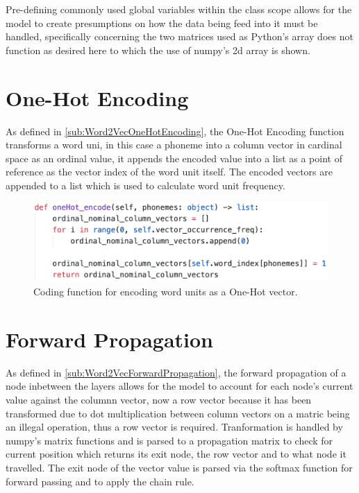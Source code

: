 Pre-defining commonly used global variables within the class scope allows for the model to create presumptions on how the data being feed into it must be handled, specifically concerning the two matrices used as Python's array does not function as desired here to which the use of numpy's 2d array is shown.

\section{One-Hot Encoding}

As defined in \autoref{sub:Word2VecOneHotEncoding}, the One-Hot Encoding function transforms a word uni, in this case a phoneme into a column vector in cardinal space as an ordinal value, it appends the encoded value into a list as a point of reference as the vector index of the word unit itself. The encoded vectors are appended to a list which is used to calculate word unit frequency.

\begin{figure}[H]
    \centering
    \includegraphics[width=\textwidth]{figures/chapter-6/OneHotEncoding.png}
    \caption[Coding function for encoding word units as a One-Hot vector]{Coding function for encoding word units as a One-Hot vector.
    \label{fig:onehot_encoding}}
\end{figure}

\section{Forward Propagation}

As defined in \autoref{sub:Word2VecForwardPropagation}, the forward propagation of a node inbetween the layers allows for the model to account for each node's current value against the columnn vector, now a row vector because it has been transformed due to dot multiplication between column vectors on a matric being an illegal operation, thus a row vector is required. Tranformation is handled by numpy's matrix functions and is parsed to a propagation matrix to check for current position which returns its exit node, the row vector and to what node it travelled. The exit node of the vector value is parsed via the softmax function for forward passing and to apply the chain rule.

